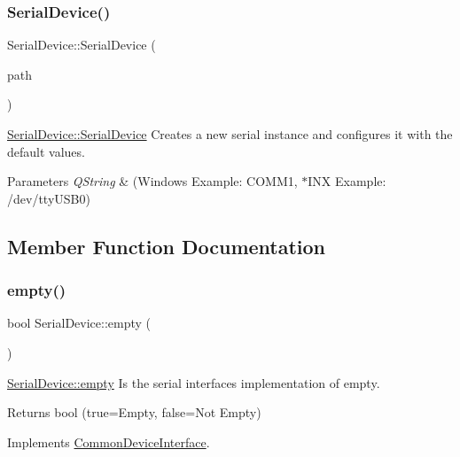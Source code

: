 \subsubsection{\texorpdfstring{Serial\+Device()}{SerialDevice()}\hspace{0.1cm}{\footnotesize\ttfamily [2/2]}}
{\footnotesize\ttfamily Serial\+Device\+::\+Serial\+Device (\begin{DoxyParamCaption}\item[{Q\+String}]{path }\end{DoxyParamCaption})}



\hyperlink{class_serial_device_aad126bede3b0adf49e1fbe3afd7c6c42}{Serial\+Device\+::\+Serial\+Device} Creates a new serial instance and configures it with the default values. 


\begin{DoxyParams}{Parameters}
{\em Q\+String} & (Windows Example\+: C\+O\+M\+M1, $\ast$\+I\+NX Example\+: /dev/tty\+U\+S\+B0) \\
\hline
\end{DoxyParams}


\subsection{Member Function Documentation}
\hypertarget{class_serial_device_ae9fc540188704dbdbf3e75d482a92b86}{}\label{class_serial_device_ae9fc540188704dbdbf3e75d482a92b86} 
\subsubsection{\texorpdfstring{empty()}{empty()}}
{\footnotesize\ttfamily bool Serial\+Device\+::empty (\begin{DoxyParamCaption}{ }\end{DoxyParamCaption})\hspace{0.3cm}{\ttfamily [virtual]}}



\hyperlink{class_serial_device_ae9fc540188704dbdbf3e75d482a92b86}{Serial\+Device\+::empty} Is the serial interface\textquotesingle{}s implementation of empty. 

\begin{DoxyReturn}{Returns}
bool (true=Empty, false=Not Empty) 
\end{DoxyReturn}


Implements \hyperlink{class_common_device_interface}{Common\+Device\+Interface}.

